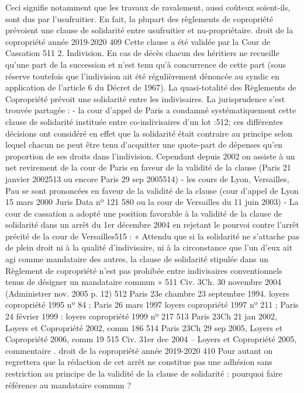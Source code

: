 Ceci signifie notamment que les travaux de ravalement, aussi coûteux soient-ils, sont dus par l'usufruitier.
En fait, la plupart des règlements de copropriété prévoient une clause de solidarité entre usufruitier et nu-propriétaire.
droit de la copropriété année 2019-2020
409
Cette clause a été validée par la Cour de Cassation 511
2. Indivision.
En cas de décès chacun des héritiers ne recueille qu'une part de la succession et n'est tenu qu'à concurrence de cette part (sous réserve toutefois que l'indivision ait été régulièrement dénoncée au syndic en application de l'article 6 du Décret de 1967).
La quasi-totalité des Règlements de Copropriété prévoit une solidarité entre les indivisaires.
La jurisprudence s’est trouvée partagée :
- la cour d'appel de Paris a condamné systématiquement cette clause de solidarité instituée entre co-indivisaires d'un lot :512; ces différentes décisions ont considéré en effet que la solidarité était contraire au principe selon lequel chacun ne peut être tenu d'acquitter une quote-part de dépenses qu'en proportion de ses droits dans l'indivision. Cependant depuis 2002 on assiste à un net revirement de la cour de Paris en faveur de la validité de la clause (Paris 21 janvier 2002513 ou encore Paris 29 sep 2005514)
- les cours de Lyon, Versailles, Pau se sont prononcées en faveur de la validité de la clause (cour d'appel de Lyon 15 mars 2000 Juris Data nº 121 580 ou la cour de Versailles du 11 juin 2003)
- La cour de cassation a adopté une position favorable à la validité de la clause de solidarité dans un arrêt du 1er décembre 2004 en rejetant le pourvoi contre l’arrêt précité de la cour de Versailles515 :
« Attendu que si la solidarité ne s’attache pas de plein droit ni à la qualité d’indivisaire, ni à la circonstance que l’un d’eux ait agi comme mandataire des autres, la clause de solidarité stipulée dans un Règlement de copropriété n’est pas prohibée entre indivisaires conventionnels tenus de désigner un mandataire commun »
511 Civ. 3\degres Ch. 30 novembre 2004 (Administrer nov. 2005 p. 12)
512 Paris 23e chambre 23 septembre 1994. loyers copropriété 1995 nº 84 ; Paris 26 mars 1997 loyers copropriété 1997 nº 211 ; Paris 24 février 1999 : loyers copropriété 1999 nº 217
513 Paris 23\degres Ch 21 jan 2002, Loyers et Copropriété 2002, comm 186
514 Paris 23\degres Ch 29 sep 2005, Loyers et Copropriété 2006, comm 19
515 Civ. 3\degres 1er dec 2004 – Loyers et Copropriété 2005, commentaire .
droit de la copropriété année 2019-2020
410
Pour autant on regrettera que la rédaction de cet arrêt ne constitue pas une adhésion sans restriction au principe de la validité de la clause de solidarité : pourquoi faire référence au mandataire commun ?
